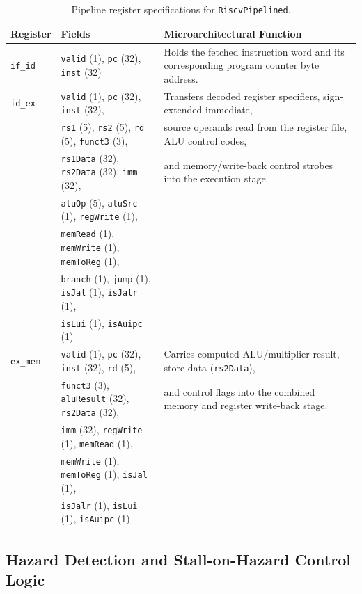 \begin{table}[htbp]
\centering
\small
\begin{tabular}{|l|l|p{8.5cm}|}
\hline
\textbf{Register} & \textbf{Fields} & \textbf{Microarchitectural Function} \\
\hline
\texttt{if\_id} & \texttt{valid} (1), \texttt{pc} (32), \texttt{inst} (32) & 
Holds the fetched instruction word and its corresponding program counter byte address. \\
\hline
\texttt{id\_ex} & \texttt{valid} (1), \texttt{pc} (32), \texttt{inst} (32), & 
Transfers decoded register specifiers, sign-extended immediate, \\
& \texttt{rs1} (5), \texttt{rs2} (5), \texttt{rd} (5), \texttt{funct3} (3), &
source operands read from the register file, ALU control codes, \\
& \texttt{rs1Data} (32), \texttt{rs2Data} (32), \texttt{imm} (32), &
and memory/write-back control strobes into the execution stage. \\
& \texttt{aluOp} (5), \texttt{aluSrc} (1), \texttt{regWrite} (1), & \\
& \texttt{memRead} (1), \texttt{memWrite} (1), \texttt{memToReg} (1), & \\
& \texttt{branch} (1), \texttt{jump} (1), \texttt{isJal} (1), \texttt{isJalr} (1), & \\
& \texttt{isLui} (1), \texttt{isAuipc} (1) & \\
\hline
\texttt{ex\_mem} & \texttt{valid} (1), \texttt{pc} (32), \texttt{inst} (32), \texttt{rd} (5), & 
Carries computed ALU/multiplier result, store data (\texttt{rs2Data}), \\
& \texttt{funct3} (3), \texttt{aluResult} (32), \texttt{rs2Data} (32), & 
and control flags into the combined memory and register write-back stage. \\
& \texttt{imm} (32), \texttt{regWrite} (1), \texttt{memRead} (1), & \\
& \texttt{memWrite} (1), \texttt{memToReg} (1), \texttt{isJal} (1), & \\
& \texttt{isJalr} (1), \texttt{isLui} (1), \texttt{isAuipc} (1) & \\
\hline
\end{tabular}
\caption{Pipeline register specifications for \texttt{RiscvPipelined}.}\label{tab:pipeline_registers}
\end{table}

\subsection{Hazard Detection and Stall-on-Hazard Control Logic}

